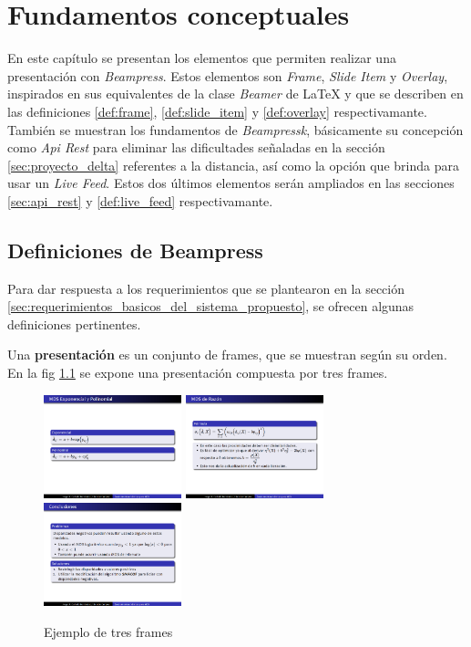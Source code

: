 
\chapter{Fundamentos conceptuales} %
\label{cha:fundamentos_conceptuales}
	En este capítulo se presentan los elementos que permiten realizar una presentación con \textit{Beampress}. Estos elementos son \textit{Frame}, \textit{Slide Item} y \textit{Overlay}, inspirados en sus equivalentes de la clase \textit{Beamer} de \LaTeX{} y que se describen en las definiciones \ref{def:frame}, \ref{def:slide_item} y \ref{def:overlay} respectivamante. También se muestran los fundamentos de \textit{Beampressk}, básicamente su concepción como \textit{Api Rest} para eliminar las dificultades señaladas en la sección \ref{sec:proyecto_delta} referentes a la distancia, así como la opción que brinda para usar un \textit{Live Feed}. Estos dos últimos elementos serán ampliados en las secciones \ref{sec:api_rest} y \ref{def:live_feed} respectivamante. 

	\section{Definiciones de Beampress} %
	\label{sec:definiciones_de_beampress}
		Para dar respuesta a los requerimientos que se plantearon en la sección \ref{sec:requerimientos_basicos_del_sistema_propuesto}, se ofrecen algunas definiciones pertinentes.
		
 		\begin{definition}
 		\label{def:presentation}
			Una \textbf{presentación} es un conjunto de frames, que se muestran según su orden. En la fig \ref{fig:frames} se expone una presentación compuesta por tres frames.
 		\end{definition}

 		\begin{figure}[tb]
 			\centering
 			\includegraphics[width=4cm]{img/f1}
 			\includegraphics[width=4cm]{img/f2}
 			\includegraphics[width=4cm]{img/f3}
 			\caption{Ejemplo de tres frames}
 			\label{fig:frames}
 		\end{figure}

